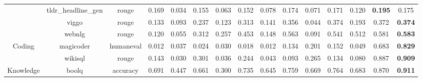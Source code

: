 \begin{table}[]
{\begin{tabular}{ccccccccccccccc}
                                   & tldr\_headline\_gen            & rouge                            & 0.169              & 0.034             & 0.155                      & 0.063             & 0.152                      & 0.078               & 0.174                    & 0.071               & 0.171                        & 0.120                   & \textbf{0.195}         & 0.175          \\
                                   & viggo                          & rouge                            & 0.133              & 0.093             & 0.237                      & 0.123             & 0.313                      & 0.141               & 0.356                    & 0.044               & 0.374                        & 0.193                   & 0.372                  & \textbf{0.374} \\
                                   & webnlg                         & rouge                            & 0.120              & 0.055             & 0.312                      & 0.257             & 0.453                      & 0.148               & 0.563                    & 0.091               & 0.541                        & 0.512                   & 0.581                  & \textbf{0.583} \\
\multirow{2}{*}{Coding}            & magicoder                      & humaneval                        & 0.012              & 0.037             & 0.024                      & 0.030             & 0.018                      & 0.012               & 0.134                    & 0.201               & 0.152                        & 0.049                   & 0.683                  & \textbf{0.829} \\
                                   & wikisql                        & rouge                            & 0.143              & 0.030             & 0.301                      & 0.036             & 0.244                      & 0.043               & 0.093                    & 0.265               & 0.134                        & 0.080                   & 0.887                  & \textbf{0.909} \\
\multirow{8}{*}{Knowledge}         & boolq                          & accuracy                         & 0.691              & 0.447             & 0.661                      & 0.300             & 0.735                      & 0.645               & 0.759                    & 0.669               & 0.764                        & 0.683                   & 0.870                  & \textbf{0.911} \\

\end{tabular}}
\end{table}
